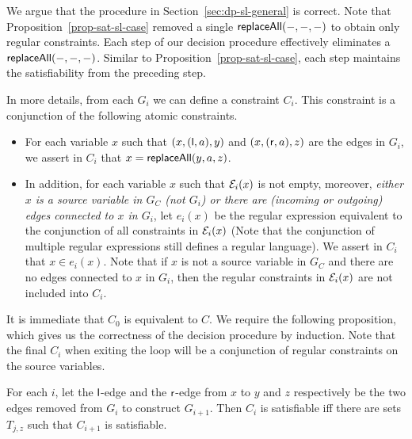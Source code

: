 We argue that the procedure in Section~\ref{sec:dp-sl-general} is correct.
Note that Proposition~\ref{prop-sat-sl-case} removed a single $\mathsf{replaceAll}(-,-,-)$ to obtain only regular constraints.
Each step of our decision procedure effectively eliminates a $\mathsf{replaceAll}(-,-,-)$.
Similar to Proposition~\ref{prop-sat-sl-case}, each step maintains the satisfiability from the preceding step.

In more details, from each $G_i$ we can define a constraint $C_i$. This constraint is a conjunction of the following atomic constraints.
\begin{itemize}
\item For each variable $x$ such that $(x, (\mathsf{l}, a), y)$ and $(x, (\mathsf{r},a), z)$ are the edges in $G_i$, we assert in $C_i$ that $x = \mathsf{replaceAll}(y, a, z)$.
\item In addition, for each variable $x$ such that $\mathcal{E}_i(x)$ is not empty, moreover, \emph{either $x$ is a source variable in $G_C$ (not $G_i$) or there are (incoming or outgoing) edges connected to $x$ in $G_i$}, let $e_i(x)$ be the regular expression equivalent to the conjunction of all constraints in $\mathcal{E}_i(x)$ (Note that the conjunction of multiple regular expressions still defines a regular language). We assert in $C_i$ that $x \in e_i(x)$. Note that if $x$ is not a source variable in $G_C$ and there are no edges connected to $x$ in $G_i$, then the regular constraints in $\mathcal{E}_i(x)$ are not included into $C_i$.
\end{itemize}


It is immediate that $C_0$ is equivalent to $C$.
We require the following proposition, which gives us the correctness of the decision procedure by induction.
Note that the final $C_i$ when exiting the loop will be a conjunction of regular constraints on the source variables.

\begin{proposition}
    For each $i$,  let the $\mathsf{l}$-edge and the $\mathsf{r}$-edge from $x$ to $y$ and $z$ respectively be the two edges removed from $G_i$ to construct $G_{i+1}$. Then $C_i$ is satisfiable iff there are sets $T_{j, z}$ such that $C_{i+1}$ is satisfiable.
\end{proposition}

